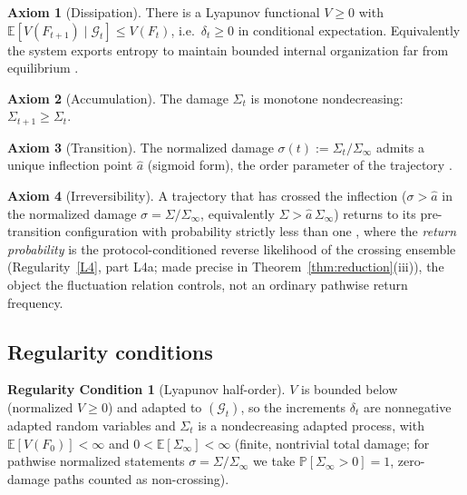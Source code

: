 \documentclass[11pt]{article}
\theoremstyle{plain}
\theoremstyle{definition}
\newtheorem{axiom}{Axiom}
\newtheorem{regularity}{Regularity Condition}
\theoremstyle{remark}
\newcommand{\E}{\mathbb{E}}
\begin{document}
\begin{axiom}[Dissipation]\label{ax:diss}
There is a Lyapunov functional $V\ge0$ with $\E[V(F_{t+1})\mid\mathcal G_t]\le V(F_t)$, i.e.\ $\delta_t\ge0$ in conditional expectation. Equivalently the system exports entropy to maintain bounded internal organization far from equilibrium \citep{prigogine1977}.
\end{axiom}

\begin{axiom}[Accumulation]\label{ax:acc}
The damage $\Sigma_t$ is monotone nondecreasing: $\Sigma_{t+1}\ge\Sigma_t$.
\end{axiom}

\begin{axiom}[Transition]\label{ax:trans}
The normalized damage $\sigma(t):=\Sigma_t/\Sigma_\infty$ admits a unique inflection point $\hat a$ (sigmoid form), the order parameter of the trajectory \citep{scheffer2009}.
\end{axiom}

\begin{axiom}[Irreversibility]\label{ax:irr}
A trajectory that has crossed the inflection ($\sigma>\hat a$ in the normalized damage $\sigma=\Sigma/\Sigma_\infty$, equivalently $\Sigma>\hat a\,\Sigma_\infty$) returns to its pre-transition configuration with probability strictly less than one \citep{seifert2012}, where the \emph{return probability} is the protocol-conditioned reverse likelihood of the crossing ensemble (Regularity~\ref{L4}, part L4a; made precise in Theorem~\ref{thm:reduction}(iii)), the object the fluctuation relation controls, not an ordinary pathwise return frequency.
\end{axiom}

\subsection{Regularity conditions}

\begin{regularity}[Lyapunov half-order]\label{L1}
$V$ is bounded below (normalized $V\ge0$) and adapted to $(\mathcal G_t)$, so the increments $\delta_t$ are nonnegative adapted random variables and $\Sigma_t$ is a nondecreasing adapted process, with $\E[V(F_0)]<\infty$ and $0<\E[\Sigma_\infty]<\infty$ (finite, nontrivial total damage; for pathwise normalized statements $\sigma=\Sigma/\Sigma_\infty$ we take $\mathbb P[\Sigma_\infty>0]=1$, zero-damage paths counted as non-crossing).
\end{regularity}
\end{document}
